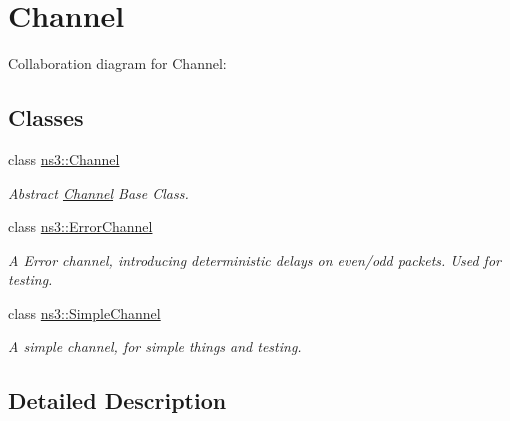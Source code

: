 \hypertarget{group__channel}{}\section{Channel}
\label{group__channel}
Collaboration diagram for Channel\+:
\subsection*{Classes}
\begin{DoxyCompactItemize}
\item 
class \hyperlink{classns3_1_1Channel}{ns3\+::\+Channel}
\begin{DoxyCompactList}\small\item\em Abstract \hyperlink{classns3_1_1Channel}{Channel} Base Class. \end{DoxyCompactList}\item 
class \hyperlink{classns3_1_1ErrorChannel}{ns3\+::\+Error\+Channel}
\begin{DoxyCompactList}\small\item\em A Error channel, introducing deterministic delays on even/odd packets. Used for testing. \end{DoxyCompactList}\item 
class \hyperlink{classns3_1_1SimpleChannel}{ns3\+::\+Simple\+Channel}
\begin{DoxyCompactList}\small\item\em A simple channel, for simple things and testing. \end{DoxyCompactList}\end{DoxyCompactItemize}


\subsection{Detailed Description}

